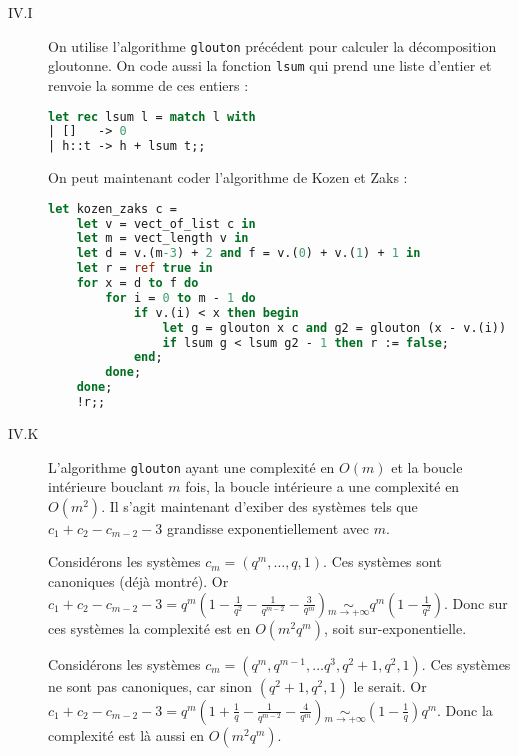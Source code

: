 \documentclass{article}
\begin{document}
\begin{description}
    \item[IV.I] On utilise l'algorithme \texttt{glouton} précédent pour calculer la décomposition gloutonne. On code aussi la fonction \texttt{lsum} qui prend une liste d'entier et renvoie la somme de ces entiers :
        \begin{lstlisting}[language=Caml]
let rec lsum l = match l with
| []   -> 0
| h::t -> h + lsum t;;
        \end{lstlisting}

        On peut maintenant coder l'algorithme de Kozen et Zaks :
        \begin{lstlisting}[language=Caml]
let kozen_zaks c =
    let v = vect_of_list c in
    let m = vect_length v in
    let d = v.(m-3) + 2 and f = v.(0) + v.(1) + 1 in
    let r = ref true in
    for x = d to f do
        for i = 0 to m - 1 do
            if v.(i) < x then begin
                let g = glouton x c and g2 = glouton (x - v.(i)) c in
                if lsum g < lsum g2 - 1 then r := false;
            end;
        done;
    done;
    !r;;
        \end{lstlisting}

    \item[IV.K] L'algorithme \texttt{glouton} ayant une complexité en $O(m)$ et la boucle intérieure bouclant $m$ fois, la boucle intérieure a une complexité en $O(m^2)$. Il s'agit maintenant d'exiber des systèmes tels que $c_1 + c_2 - c_{m-2} - 3$ grandisse exponentiellement avec $m$.

        Considérons les systèmes $c_m = (q^m, \ldots, q, 1)$. Ces systèmes sont canoniques (déjà montré). Or $c_1 + c_2 - c_{m-2} - 3 = q^m\left(1 - \frac{1}{q^2} - \frac{1}{q^{m-2}} - \frac{3}{q^m}\right) \underset{m\rightarrow +\infty}{\sim} q^m\left(1 - \frac{1}{q^2}\right)$. Donc sur ces systèmes la complexité est en $O(m^2q^m)$, soit sur-exponentielle.

        Considérons les systèmes $c_m = (q^m, q^{m-1}, \ldots q^3, q^2+1, q^2, 1)$. Ces systèmes ne sont pas canoniques, car sinon $(q^2+1,q^2,1)$ le serait. Or $c_1 + c_2 - c_{m-2} - 3 = q^m\left(1 + \frac{1}{q} - \frac{1}{q^{m-2}} - \frac{4}{q^m}\right) \underset{m\rightarrow +\infty}{\sim} \left(1 - \frac{1}{q}\right)q^m$. Donc la complexité est là aussi en $O(m^2q^m)$.
\end{description}
\end{document}
